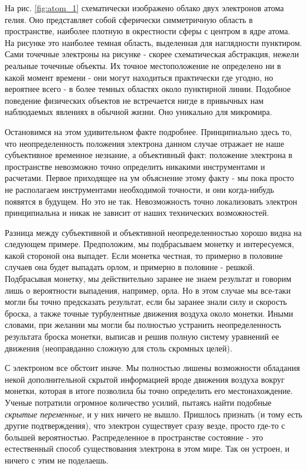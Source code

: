На рис. \ref{fig:atom_1} схематически изображено облако двух электронов атома гелия.
Оно представляет собой сферически симметричную область в пространстве, наиболее плотную в окрестности сферы с центром в ядре атома.
На рисунке это наиболее темная область, выделенная для наглядности пунктиром.
Сами точечные электроны на рисунке - скорее схематическая абстракция, нежели реальные точечные объекты.
Их точное местоположение не определено ни в какой момент времени - они могут находиться практически где угодно, но вероятнее всего - в более темных областях около пунктирной линии.
Подобное поведение физических объектов не встречается нигде в привычных нам наблюдаемых явлениях в обычной жизни.
Оно уникально для микромира. 

Остановимся на этом удивительном факте подробнее.
Принципиально здесь то, что неопределенность положения электрона данном случае отражает не наше субъективное временное незнание, а объективный факт: положение электрона в пространстве невозможно точно определить никакими инструментами и расчетами.
Первое приходящее на ум объяснение этому факту - мы пока просто не располагаем инструментами необходимой точности, и они когда-нибудь появятся в будущем.
Но это не так.
Невозможность точно локализовать электрон принципиальна и никак не зависит от наших технических возможностей.

Разница между субъективной и объективной неопределенностью хорошо видна на следующем примере.
Предположим, мы подбрасываем монетку и интересуемся, какой стороной она выпадет.
Если монетка честная, то примерно в половине случаев она будет выпадать орлом, и примерно в половине - решкой.
Подбрасывая монетку, мы действительно заранее не знаем результат и говорим лишь о вероятности выпадения, например, орла.
Но в этом случае мы все-таки могли бы точно предсказать результат, если бы заранее знали силу и скорость броска, а также точные турбулентные движения воздуха около монетки.
Иными словами, при желании мы могли бы полностью устранить неопределенность результата броска монетки, выписав и решив полную систему уравнений ее движения (неоправданно сложную для столь скромных целей). 

С электроном все обстоит иначе.
Мы полностью лишены возможности обладания некой дополнительной скрытой информацией вроде движения воздуха вокруг монетки, которая в итоге позволила бы точно определить его местонахождение.
Ученые потратили огромное количество усилий, пытаясь найти подобные \textit{скрытые переменные}, и у них ничего не вышло.
Пришлось признать (и тому есть другие подтверждения), что электрон существует сразу везде, просто где-то с большей вероятностью. 
Распределенное в пространстве состояние - это естественный способ существования электрона в этом мире.
Так он устроен, и ничего с этим не поделаешь. 

